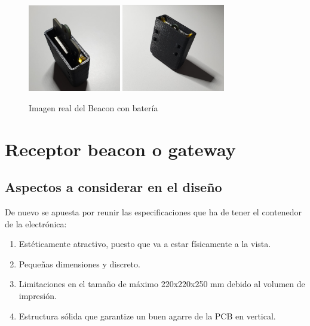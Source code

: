 \documentclass[a4paper ,12pt, onecolumn]{article}
\begin{document}
        \paragraph{}
        \begin{center}
            \begin{figure}[h]
                \centering
                \includegraphics[width=0.36\textwidth]{../3d_beacon_1.jpeg}
                \includegraphics[width=0.4\textwidth]{../3d_beacon_2.jpeg}
                \caption{Imagen real del Beacon con batería}
                \label{fig:mesh1}
            \end{figure}
        \end{center}

\section{Receptor beacon o gateway}
    \subsection{Aspectos a considerar en el diseño}
        De nuevo se apuesta por reunir las especificaciones que ha de tener el contenedor de la electrónica:
        \begin{enumerate}
            \item Estéticamente atractivo, puesto que va a estar físicamente a la vista.
            \item Pequeñas dimensiones y discreto.
            \item Limitaciones en el tamaño de máximo 220x220x250 mm debido al volumen de impresión.
            \item Estructura sólida que garantize un buen agarre de la PCB en vertical.
        \end{enumerate}
\end{document}
